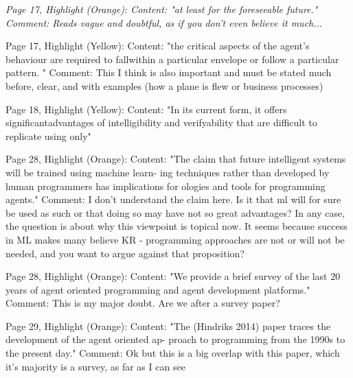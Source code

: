 \documentclass[12pt]{article}
\newenvironment{reviews}{\bigskip\itshape}{\upshape\bigskip}
\begin{document}
\begin{reviews}
Page 17, Highlight (Orange):
Content: "at least for the foreseeable future."
Comment: Reads vague and doubtful, as if you don't even believe it much...

Page 17, Highlight (Yellow):
Content: "the critical aspects of the agent's behaviour are required to fallwithin a particular envelope or follow a particular pattern. "
Comment: This I think is also important and must be stated much before, clear, and with examples (how a plane is flew or business processes)

Page 18, Highlight (Yellow):
Content: "In its current form, it offers significantadvantages of intelligibility and verifyability that are difficult to replicate using only"

Page 28, Highlight (Orange):
Content: "The claim that future intelligent systems will be trained using machine learn- ing techniques rather than developed by human programmers has implications for ologies and tools for programming agents."
Comment: I don't understand the claim here. Is it that ml will for sure be used as such or that doing so may have not so great advantages? In any case, the question is about why this viewpoint is topical now. It seems because success in ML makes many believe KR - programming approaches are not or will not be needed, and you want to argue against that proposition?

Page 28, Highlight (Orange):
Content: "We provide a brief survey of the last 20 years of agent oriented programming and agent development platforms."
Comment: This is my major doubt. Are we after a survey paper?

Page 29, Highlight (Orange):
Content: "The (Hindriks 2014) paper traces the development of the agent oriented ap- proach to programming from the 1990s to the present day."
Comment: Ok but this is a big overlap with this paper, which it's majority is a survey, as far as I can see

\end{reviews}
\end{document}
